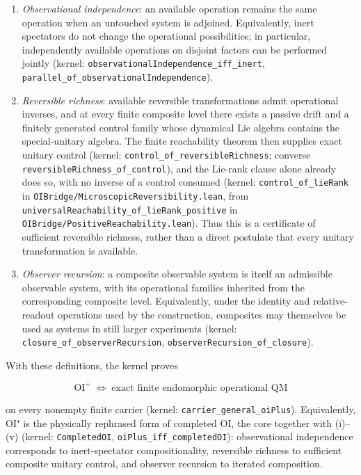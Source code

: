 \documentclass[
]{article}
\begin{document}
\begin{enumerate}
\def\labelenumi{\arabic{enumi}.}
\item
  \emph{Observational independence}: an available operation remains the
  same operation when an untouched system is adjoined. Equivalently,
  inert spectators do not change the operational possibilities; in
  particular, independently available operations on disjoint factors can
  be performed jointly (kernel:
  \texttt{observationalIndependence\_iff\_inert},
  \texttt{parallel\_of\_observationalIndependence}).
\item
  \emph{Reversible richness}: available reversible transformations admit
  operational inverses, and at every finite composite level there exists
  a passive drift and a finitely generated control family whose
  dynamical Lie algebra contains the special-unitary algebra. The finite
  reachability theorem then supplies exact unitary control (kernel:
  \texttt{control\_of\_reversibleRichness}; converse
  \texttt{reversibleRichness\_of\_control}), and the Lie-rank clause
  alone already does so, with no inverse of a control consumed (kernel:
  \texttt{control\_of\_lieRank} in
  \texttt{OIBridge/MicroscopicReversibility.lean}, from
  \texttt{universalReachability\_of\_lieRank\_positive} in
  \texttt{OIBridge/PositiveReachability.lean}). Thus this is a
  certificate of sufficient reversible richness, rather than a direct
  postulate that every unitary transformation is available.
\item
  \emph{Observer recursion}: a composite observable system is itself an
  admissible observable system, with its operational families inherited
  from the corresponding composite level. Equivalently, under the
  identity and relative-readout operations used by the construction,
  composites may themselves be used as systems in still larger
  experiments (kernel: \texttt{closure\_of\_observerRecursion},
  \texttt{observerRecursion\_of\_closure}).
\end{enumerate}

With these definitions, the kernel proves

\[\boxed{\;\mathrm{OI}^{+} \;\iff\; \text{exact finite endomorphic operational QM}\;}\]

on every nonempty finite carrier (kernel:
\texttt{carrier\_general\_oiPlus}). Equivalently, OI⁺ is the physically
rephrased form of completed OI, the core together with (i)--(v) (kernel:
\texttt{CompletedOI}, \texttt{oiPlus\_iff\_completedOI}): observational
independence corresponds to inert-spectator compositionality, reversible
richness to sufficient composite unitary control, and observer recursion
to iterated composition.
\end{document}
